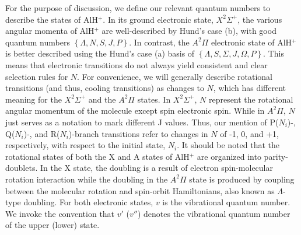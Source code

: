 \documentclass[nofootinbib,aip,jcp,reprint]{revtex4-1}
\begin{document}
For the purpose of discussion, we define our relevant quantum numbers to describe the states of AlH$^+$. In its ground electronic state, $X^2\Sigma^+$, the various angular momenta of AlH$^+$ are well-described by Hund's case (b), with good quantum numbers  $\left\lbrace\right.\! \Lambda, N, S, J, P \!\left.\right\rbrace$. In contrast, the $A^2\Pi$  electronic state of AlH$^+$ is better described using the Hund's case (a) basis of $\left\lbrace\right.\! \Lambda, S, \Sigma, J, \Omega, \mathit{P} \!\left.\right\rbrace$. This means that electronic transitions do not always yield consistent and clear selection rules for $N$. For convenience, we will generally describe rotational transitions (and thus, cooling transitions) as changes to $N$, which has different meaning for the $X^2\Sigma^+$ and the $A^2\Pi$ states. In $X^2\Sigma^+$, $N$ represent the rotational angular momentum of the molecule except spin electronic spin. While in $A^2\Pi$, $N$ just serves as a notation to mark different J values. Thus, our mention of P($N_i$)-, Q($N_i$)-, and R($N_i$)-branch transitions refer to changes in $N$ of -1, 0, and +1, respectively, with respect to the initial state, $N_i$. It should be noted that the rotational states of both the X and A states of AlH$^+$ are organized into parity-doublets. In the X state, the doubling is a result of electron spin-molecular rotation interaction while the doubling in the $A^2\Pi$ state is produced by coupling between the molecular rotation and spin-orbit Hamiltonians, also known as $\Lambda$-type doubling. For both electronic states, $v$ is the vibrational quantum number. We invoke the convention that $v'$ ($v''$) denotes the vibrational quantum number of the upper (lower) state.
\end{document}
